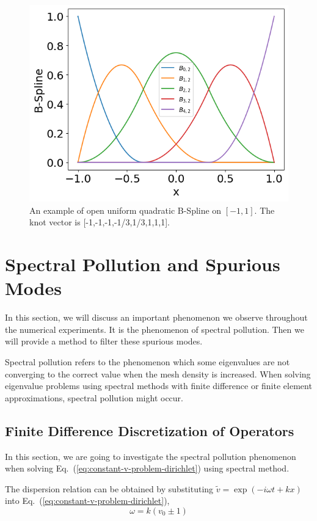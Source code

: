 \begin{figure} [H]
	\centering
	\includegraphics[width=0.7\linewidth]{figures/bspline}
	\caption{An example of open uniform quadratic B-Spline on $[-1,1]$. The knot vector is [-1,-1,-1,-1/3,1/3,1,1,1].}
	\label{fig:bspline}
\end{figure}



\section{Spectral Pollution and Spurious Modes}
In this section, we will discuss an important phenomenon we observe throughout the numerical experiments. It is the phenomenon of spectral pollution. Then we will provide a method to filter these spurious modes.

Spectral pollution refers to the phenomenon which some eigenvalues are not converging to the correct value when the mesh density is increased. When solving eigenvalue problems using spectral methods with finite difference or finite element approximations, spectral pollution might occur. \cite{llobet_spectral_1990}

\subsection{Finite Difference Discretization of Operators}
In this section, we are going to investigate the spectral pollution phenomenon when solving Eq.~(\ref{eq:constant-v-problem-dirichlet}) using spectral method.

The dispersion relation can be obtained by substituting $\tilde{v} = \exp(-i\omega t + kx)$ into Eq.~(\ref{eq:constant-v-problem-dirichlet}),
\begin{equation} \label{dispersion-relation}
	\omega = k(v_0 \pm 1)
\end{equation}

